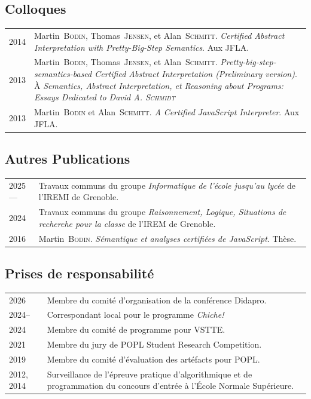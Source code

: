 \documentclass[12pt,a4paper]{article}
\makeatletter
\newenvironment{datecvsection}[1]%
               {\subsection*{#1}%
                 \noindent \begin{longtable}{@{}p{\annee}p{\texte}@{}}}
               {\end{longtable}}
\newcommand\familyName{\textsc}
\newcommand\placeName{}
\makeatother
\begin{document}
\begin{datecvsection}{Colloques}
  2014 & Martin~\familyName{Bodin}, Thomas~\familyName{Jensen}, et Alan~\familyName{Schmitt}. \textit{Certified Abstract Interpretation with Pretty-Big-Step Semantics}. Aux JFLA. \\

  2013 & Martin~\familyName{Bodin}, Thomas~\familyName{Jensen}, et Alan~\familyName{Schmitt}. \textit{Pretty-big-step-semantics-based Certified Abstract Interpretation (Preliminary version)}. À \textit{Semantics, Abstract Interpretation, et Reasoning about Programs: Essays Dedicated to David A. \textsc{Schmidt}} \\ %

  2013 & Martin~\familyName{Bodin} et Alan~\familyName{Schmitt}. \textit{A Certified JavaScript Interpreter}. Aux JFLA. \\

\end{datecvsection}

\begin{datecvsection}{Autres Publications}

		2025— & Travaux communs du groupe \textit{Informatique de l'école jusqu'au lycée} de l'IREMI de \placeName{Grenoble}. \\

		2024 & Travaux communs du groupe \textit{Raisonnement, Logique, Situations de recherche pour la classe} de l'IREM de \placeName{Grenoble}. \\

    2016 & Martin~\familyName{Bodin}. \textit{Sémantique et analyses certifiées de JavaScript}. Thèse. \\

\end{datecvsection}


\begin{datecvsection}{Prises de responsabilité}

		2026 & Membre du comité d'organisation de la conférence Didapro. \\

		2024– & Correspondant local pour le programme \textit{Chiche!} \\

		2024 & Membre du comité de programme pour VSTTE. \\

		2021 & Membre du jury de POPL Student Research Competition. \\

    2019 & Membre du comité d’évaluation des artéfacts pour POPL. \\

    2012, 2014 & Surveillance de l’épreuve pratique d’algorithmique et de programmation du concours d’entrée à l’\placeName{École Normale Supérieure}.

\end{datecvsection}
\end{document}
